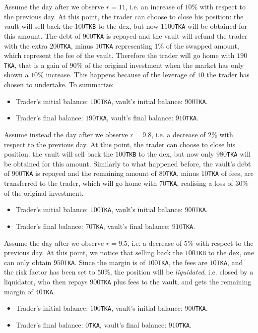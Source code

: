 \documentclass[a4paper,10 pt]{article}
\theoremstyle{definition}
\begin{document}
Assume the day after we observe $r = 11$, i.e. an increase of $10$\% with respect to the previous day. At this point, the trader can choose to close his position: the vault will sell back the $100$\verb|TKB| to the dex, but now $1100$\verb|TKA| will be obtained for this amount. The debt of $900$\verb|TKA| is repayed and the vault will refund the trader with the extra $200$\verb|TKA|, minus $10$\verb|TKA| representing $1$\% of the swapped amount, which represent the fee of the vault. Therefore the trader will go home with $190$\verb|TKA|, that is a gain of $90$\% of the original investment when the market has only shown a $10$\% increase. This happens because of the leverage of $10$ the trader has chosen to undertake. To summarize:
\begin{itemize}
    \item Trader's initial balance: $100$\verb|TKA|, vault's initial balance: $900$\verb|TKA|.
    \item Trader's final balance: $190$\verb|TKA|, vault's final balance: $910$\verb|TKA|.
\end{itemize}

Assume instead the day after we observe $r = 9.8$, i.e. a decrease of $2$\% with respect to the previous day.  At this point, the trader can choose to close his position: the vault will sell back the $100$\verb|TKB| to the dex, but now only $980$\verb|TKA| will be obtained for this amount. Similarly to what happened before, the vault's debt of $900$\verb|TKA| is repayed and the remaining amount of $80$\verb|TKA|, minus $10$\verb|TKA| of fees, are transferred to the trader, which will go home with $70$\verb|TKA|, realising a loss of $30$\% of the original investment.
\begin{itemize}
    \item Trader's initial balance: $100$\verb|TKA|, vault's initial balance: $900$\verb|TKA|.
    \item Trader's final balance: $70$\verb|TKA|, vault's final balance: $910$\verb|TKA|.
\end{itemize}

Assume the day after we observe $r = 9.5$, i.e. a decrease of $5$\% with respect to the previous day.  At this point, we notice that selling back the $100$\verb|TKB| to the dex, one can only obtain $950$\verb|TKA|. Since the margin is of $100$\verb|TKA|, the fees are $10$\verb|TKA|, and the risk factor has been set to $50$\%, the position will be \emph{liquidated}, i.e. closed by a liquidator, who then repays $900$\verb|TKA| plus fees to the vault, and gets the remaining margin of $40$\verb|TKA|.
\begin{itemize}
    \item Trader's initial balance: $100$\verb|TKA|, vault's initial balance: $900$\verb|TKA|.
    \item Trader's final balance: $0$\verb|TKA|, vault's final balance: $910$\verb|TKA|.
\end{itemize}
\end{document}
